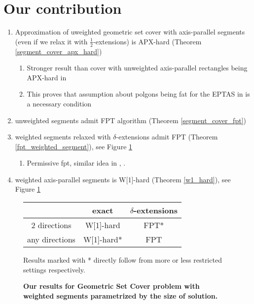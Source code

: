 \section{Our contribution}
\begin{enumerate}
\item Approximation of uweighted geometric set cover with axis-parallel segments
(even if we relax it with  $\frac{1}{2}$-extensions) is APX-hard
(Theorem \ref{segment_cover_apx_hard})
	\begin{enumerate}
	\item Stronger result than cover with unweighted axis-parallel
	rectangles being APX-hard in \cite{settling_apx_hardness}
	\item This proves that assumption about polgons being fat for
	the EPTAS in \cite{harpeled12} is a necessary condition
	\end{enumerate}
\item unweighted segments admit FPT algorithm (Theorem \ref{segment_cover_fpt})
\item weighted segments relaxed with $\delta$-extensions admit FPT (Theorem \ref{fpt_weighted_segment}),
    see Figure \ref{tab:weighted_fpt}
	\begin{enumerate}
	\item Permissive fpt, similar idea in \cite{permissive_problem1}, \cite{permissive_problem2}.
	\end{enumerate}
\item weighted axis-parallel segments is W[1]-hard (Theorem \ref{w1_hard}),
    see Figure \ref{tab:weighted_fpt}

\end{enumerate}


\begin{figure}[h]
\begin{center}
\begin{tabular}{ | c | c | c | }
\hline
                & exact     & $\delta$-extensions \\ 
\hline                
 2 directions   & W[1]-hard & FPT* \\  
\hline                
 any directions & W[1]-hard* & FPT \\
\hline                
\end{tabular}
\caption{\textbf{Our results for Geometric Set Cover problem with weighted segments 
parametrized by the size of solution.}}

Results marked with * directly follow from more or less restricted settings
respectively.
\label{tab:weighted_fpt}
\end{center}
\end{figure}


